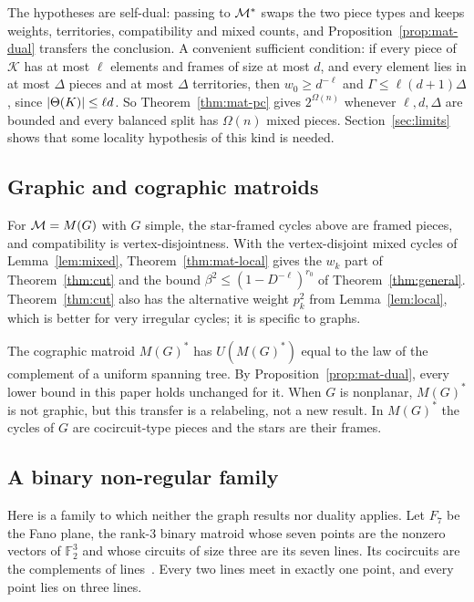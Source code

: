 The hypotheses are self-dual: passing to $\mathcal{M}^*$ swaps the two piece types and keeps weights, territories, compatibility and mixed counts, and Proposition~\ref{prop:mat-dual} transfers the conclusion. A convenient sufficient condition: if every piece of $\mathcal K$ has at most $\ell$ elements and frames of size at most $d$, and every element lies in at most $\Delta$ pieces and at most $\Delta$ territories, then $w_0\ge d^{-\ell}$ and $\Gamma\le\ell(d+1)\Delta$, since $\lvert \Theta(K)\rvert\le\ell d$. So Theorem~\ref{thm:mat-pc} gives $2^{\Omega(n)}$ whenever $\ell,d,\Delta$ are bounded and every balanced split has $\Omega(n)$ mixed pieces. Section~\ref{sec:limits} shows that some locality hypothesis of this kind is needed.

\subsection{Graphic and cographic matroids}

For $\mathcal{M}=M(G)$ with $G$ simple, the star-framed cycles above are framed pieces, and compatibility is vertex-disjointness. With the vertex-disjoint mixed cycles of Lemma~\ref{lem:mixed}, Theorem~\ref{thm:mat-local} gives the $w_k$ part of Theorem~\ref{thm:cut} and the bound $\beta^2\le(1-D^{-\ell})^{r_0}$ of Theorem~\ref{thm:general}. Theorem~\ref{thm:cut} also has the alternative weight $p_k^2$ from Lemma~\ref{lem:local}, which is better for very irregular cycles; it is specific to graphs.

The cographic matroid $M(G)^*$ has $U(M(G)^*)$ equal to the law of the complement of a uniform spanning tree. By Proposition~\ref{prop:mat-dual}, every lower bound in this paper holds unchanged for it. When $G$ is nonplanar, $M(G)^*$ is not graphic, but this transfer is a relabeling, not a new result. In $M(G)^*$ the cycles of $G$ are cocircuit-type pieces and the stars are their frames.

\subsection{A binary non-regular family}

Here is a family to which neither the graph results nor duality applies. Let $F_7$ be the Fano plane, the rank-3 binary matroid whose seven points are the nonzero vectors of $\mathbb F_2^3$ and whose circuits of size three are its seven lines. Its cocircuits are the complements of lines~\cite{Oxley11}. Every two lines meet in exactly one point, and every point lies on three lines.


